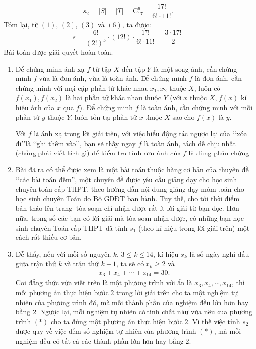 \begin{bt}
{		\begin{align}
		s_2 = \left| S\right| =\left| T\right| = \mathrm{C}^6_{17} = \dfrac{17!}{6! \cdot 11!}. \tag{6}
		\end{align}
		Tóm lại, từ $(1)$, $(2)$, $(3)$ và $(6)$, ta được: $$s= \dfrac{6!}{(2!)^3} \cdot (12!) \cdot \dfrac{17!}{6! \cdot 11!} =\dfrac{3 \cdot 17!}{2}.$$
		Bài toán được giải quyết hoàn toàn. 
\begin{nx}\hfill
	\begin{enumerate}[\bf 1.]
		\item Để chứng minh ánh xạ $f$ từ tập $X$ đến tập $Y$ là một song ánh, cần chứng minh $f$ vừa là đơn ánh, vừa là toàn ánh. Để chứng minh $f$ là đơn ánh, cần chứng minh với mọi cặp phần tử khác nhau $x_1,x_2$ thuộc $X$, luôn có $f(x_1), f(x_2)$ là hai phần tử khác nhau thuộc $Y$ (với $x$ thuộc $X$, $f(x)$ kí hiệu ảnh của $x$ qua $f$). Để chứng minh $f$ là toàn ánh, cần chứng minh với mỗi phần tử $y$ thuộc $Y$, luôn tồn tại phần tử $x$ thuộc $X$ sao cho $f(x)$ là $y$.
		
		Với $f$ là ánh xạ trong lời giải trên, với việc hiểu động tác ngược lại của \lq\lq xóa đi\rq\rq là \lq\lq ghi thêm vào\rq\rq, bạn sẽ thấy ngay $f$ là toàn ánh, cách dễ chịu nhất (chẳng phải viết lách gì) để kiểm tra tính đơn ánh của $f$ là dùng phản chứng.
		
		\item Bài đã ra có thể được xem là một bài toán thuộc hàng cơ bản của chuyên đề \lq\lq các bài toán đếm\rq\rq, một chuyên đề được yêu cầu giảng dạy cho học sinh chuyên toán cấp THPT, theo hướng dẫn nội dung giảng dạy môm toán cho học sinh chuyên Toán do Bộ GDĐT ban hành. Tuy thế, cho tới thời điểm bản thảo lên trang, tòa soạn chỉ nhận được rất ít lời giải từ bạn đọc. Hơn nữa, trong số các bạn có lời giải mà tòa soạn nhận được, có những bạn học sinh chuyên Toán cấp THPT đã tính $s_1$ (theo kí hiệu trong lời giải trên) một cách rất thiếu cơ bản.
		
		\item  Dễ thấy, nếu với mỗi số nguyên $k$, $3 \le k \le 14$, kí hiệu $x_k$ là số ngày nghỉ đấu giữa trận thứ $k$ và trận thứ $k+1$, ta sẽ có $x_k\ge 2$ và
		\begin{align}
		x_3+x_4 + \cdots + x_{14}=30. \tag{*} 
		\end{align} 
		Coi đẳng thức vừa viết trên là một phương trình với ẩn là $x_3, x_4, \cdots ,x_{14}$, thì mỗi phương án thực hiện bước $2$ trong lời giải trên cho ta một nghiệm tự nhiên của phương trình đó, mà mỗi thành phần của nghiệm đều lớn hơn hay bằng $2$. Ngược lại, mỗi nghiệm tự nhiên có tính chất như vừa nêu của phương trình $(*)$ cho ta đúng một phương án thực hiện bước $2$. Vì thế việc tính $s_2$ được quy về việc đếm số nghiệm tự nhiên của phương trình $(*)$, mà mỗi nghiệm đều có tất cả các thành phần lớn hơn hay bằng $2$.
		

\end{enumerate}
\end{nx}}
\end{bt}
